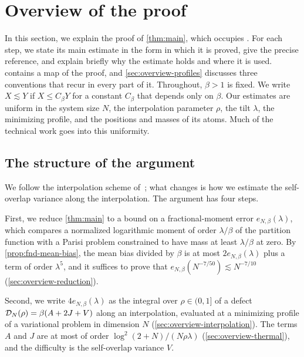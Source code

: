 \chapter{Overview of the proof}\label{sec:overview}

In this section, we explain the proof of \cref{thm:main}, which
occupies . For each step, we state its main
estimate in the form in which it is proved, give the precise reference,
and explain briefly why the estimate holds and where it is used.
 contains a map of the proof, and
\cref{sec:overview-profiles} discusses three conventions that recur in
every part of it. Throughout, $\beta>1$ is fixed. We write
$X\lesssim Y$ if $X\le C_\beta Y$ for a constant $C_\beta$ that depends
only on $\beta$. Our estimates are uniform in the system size $N$, the interpolation
parameter $\rho$, the tilt $\lambda$, the minimizing profile, and the
positions and masses of its atoms. Much of the technical work goes into
this uniformity.

\section{The structure of the argument}\label{subsec:intro-outline}

We follow the interpolation scheme of~\cite{AL}; what changes is how
we estimate the self-overlap variance along the interpolation. The argument has four steps.

First, we reduce \cref{thm:main} to a bound on a fractional-moment
error $e_{N,\beta}(\lambda)$, which compares a normalized logarithmic
moment of order $\lambda/\beta$ of the partition function with a Parisi
problem constrained to have mass at least $\lambda/\beta$ at zero. By
\cref{prop:fnd-mean-bias}, the mean bias divided by $\beta$ is at most
$2e_{N,\beta}(\lambda)$ plus a term of order $\lambda^5$, and it
suffices to prove that $e_{N,\beta}(N^{-7/50})\lesssim N^{-7/10}$
(\cref{sec:overview-reduction}).

Second, we write $4e_{N,\beta}(\lambda)$ as the integral over
$\rho\in(0,1]$ of a defect $\mathcal D_N(\rho)=\beta(A+2J+V)$ along an
interpolation, evaluated at a minimizing profile of a variational
problem in dimension $N$ (\cref{sec:overview-interpolation}). The terms
$A$ and $J$ are at most of order $\log^2(2+N)/(N\rho\lambda)$
(\cref{sec:overview-thermal}), and the difficulty is the self-overlap
variance $V$.

